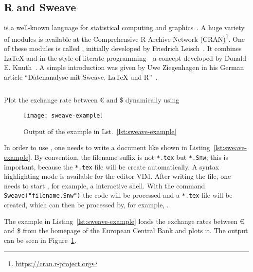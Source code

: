 \subsection{R and Sweave}

 is a well-known language for statistical computing and
graphics~\cite{Ihaka1998}.  A huge variety of modules is available at the
Comprehensive R Archive Network (CRAN)\footnote{%
  \href{https://cran.r-project.org}{https://cran.r-project.org}}.  One of these
modules is called , initially developed by Friedrich
Leisch~\cite{Leisch2002}.  It combines \LaTeX{} and  in the style of
literate programming—a concept developed by Donald E\@. Knuth~\cite{Knuth1992}.
A simple introduction was given by Uwe Ziegenhagen in his German article
\enquote{Datenanalyse mit Sweave, \LaTeX{} und R}~\cite{Ziegenhagen2010}.

\begin{listing}[H]
  \inputminted{latex}{../examples/sweave-example.Snw}
  \caption{Plot the exchange rate between \euro{} and \$ dynamically using
    }
  \label{lst:sweave-example}
\end{listing}

\begin{figure}[!t]
  \texttt{[image: sweave-example]}
  \caption{Output of the  example in
    Lst.~\ref{lst:sweave-example}}
  \label{fig:sweave-example}
\end{figure}

In order to use , one needs to write a document like shown in
Listing~\ref{lst:sweave-example}.  By convention, the filename suffix is not
\texttt{*.tex} but \texttt{*.Snw}; this is important, because the \texttt{*.tex}
file will be create automatically.  A syntax highlighting mode is available for
the editor VIM\@.  After writing the file, one needs to start ,
for example, a  interactive shell.  With the command
\texttt{Sweave("filename.Snw")} the  code will be processed
and a \texttt{*.tex} file will be created, which can then be processed by, for
example, .

The example in Listing~\ref{lst:sweave-example} loads the exchange rates between
\euro{} and \$ from the homepage of the European Central Bank and plots it. The
output can be seen in Figure~\ref{fig:sweave-example}.

